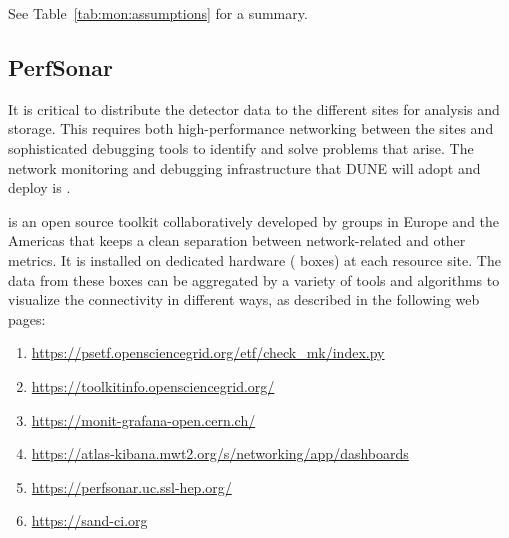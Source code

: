 \documentclass[../main-v1.tex]{subfiles}
\begin{document}
See Table~\ref{tab:mon:assumptions} for a summary. 

\subsection{PerfSonar}

It is critical to distribute the detector data to the different sites for analysis and storage. This requires both high-performance networking between the sites and sophisticated debugging tools to identify and solve problems that arise. The  network monitoring and debugging infrastructure that DUNE will adopt and deploy is .

 is an open source toolkit collaboratively developed by %
groups in Europe and the Americas that keeps a clean separation between network-related and other metrics. %
It is installed on dedicated hardware ( boxes) at %
each resource site. %
The data from these  boxes %
can be aggregated by a variety of tools and algorithms to %
visualize the connectivity in different ways, as described in the following web pages: %
\begin{enumerate}
    \item \url{https://psetf.opensciencegrid.org/etf/check_mk/index.py}
    \item \url{https://toolkitinfo.opensciencegrid.org/}
    \item \url{https://monit-grafana-open.cern.ch/}
    \item \url{https://atlas-kibana.mwt2.org/s/networking/app/dashboards}
    \item \url{https://perfsonar.uc.ssl-hep.org/}
    \item \url{https://sand-ci.org}
\end{enumerate}
\end{document}
